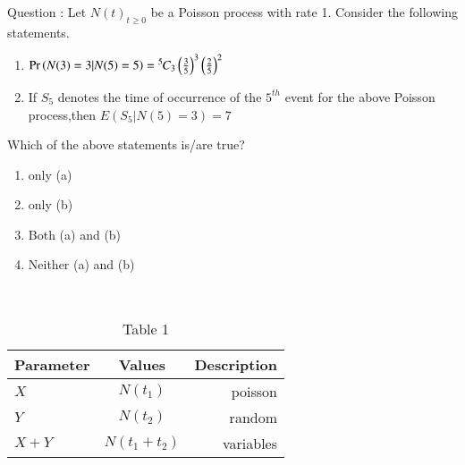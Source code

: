 \documentclass[journal,12pt,onecolumn]{IEEEtran}
\theoremstyle{remark}
\begin{document}
\let\vec\mathbf




\vspace{3cm}



\bigskip

\renewcommand{\thefigure}{\theenumi}
\renewcommand{\thetable}{\theenumi}
Question : Let ${N(t)}_{t\ge 0}$ be a Poisson process with rate 1. Consider the following statements. 
\begin{enumerate}[label=(\alph*)]
\item $\Pr\left(N(3)=3|N(5)=5\right)={{}^{5}\mkern-1muC_{3}}\left(\frac{3}{5}\right)^3 \left(\frac{2}{5}\right)^2$
\item If $S_5$ denotes the time of occurrence of the $5^{th}$ event for the above Poisson process,then $E(S_5|N(5)=3)=7$ \\
\end{enumerate}
Which of the above statements is/are true?\\
\begin{enumerate}[label=(\roman*)]
\item only (a)
\item only (b)
\item Both (a) and (b)
\item Neither (a) and (b)
\end{enumerate}
\solution \\
\begin{table}[h!]
 \begin{center}
    \begin{tabular}{|l|c|r|}
    \hline
    Parameter & Values & Description\\
    \hline
    $X$ & $N(t_1)$ & poisson  \\
    $Y$&  $N(t_2)$& random \\
    $X+Y$&  $N(t_1+t_2)$& variables \\
    \hline
    \end{tabular}
    \end{center}
    \caption{Table 1}
\end{table}
\end{document}
